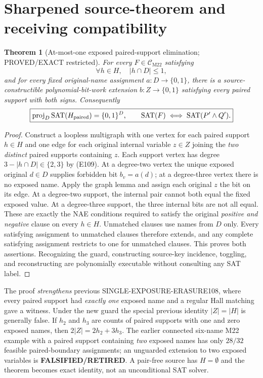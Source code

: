 \documentclass[11pt]{article}
\newtheorem{theorem}{Theorem}
\newcommand{\CM}{\mathcal C_{\mathrm{M22}}}
\newcommand{\SAT}{\operatorname{SAT}}
\begin{document}
\section{Sharpened source-theorem and receiving compatibility}
\begin{theorem}[At-most-one exposed paired-support elimination; PROVED/EXACT restricted]
For \emph{every} $F\in\CM$ satisfying
\[
\boxed{\qquad\forall h\in H,\quad |h\cap D|\le1,\qquad} \tag{E109}
\]
and for \emph{every} fixed original-name assignment $a:D\to\{0,1\}$, there is a source-constructible polynomial-bit-work extension $b:Z\to\{0,1\}$ satisfying every paired support with both signs. Consequently
\[
\boxed{\operatorname{proj}_{D}\SAT(H_{\rm paired})=\{0,1\}^{D},
\qquad\SAT(F)\iff\SAT(P'\wedge Q').}
\]
\end{theorem}
\begin{proof}
Construct a loopless multigraph with one vertex for each paired support $h\in H$ and one edge for each original internal variable $z\in Z$ joining the \emph{two distinct} paired supports containing $z$. Each support vertex has degree $3-|h\cap D|\in\{2,3\}$ by (E109). At a degree-two vertex the unique exposed original $d\in D$ supplies forbidden bit $b_v=a(d)$; at a degree-three vertex there is no exposed name. Apply the graph lemma and assign each original $z$ the bit on its edge. At a degree-two support, the internal pair cannot both equal the fixed exposed value. At a degree-three support, the three internal bits are not all equal. These are exactly the NAE conditions required to satisfy the original \emph{positive and negative} clause on every $h\in H$. Unmatched clauses use names from $D$ only. Every satisfying assignment to unmatched clauses therefore extends, and any complete satisfying assignment restricts to one for unmatched clauses. This proves both assertions. Recognizing the guard, constructing source-key incidence, toggling, and reconstructing are polynomially executable without consulting any SAT label.
\end{proof}

The proof \emph{strengthens} previous SINGLE-EXPOSURE-ERASURE108, where every paired support had \emph{exactly one} exposed name and a regular Hall matching gave a witness. Under the new guard the special previous identity $|Z|=|H|$ is generally false. If $h_2$ and $h_3$ are counts of paired supports with one and zero exposed names, then $2|Z|=2h_2+3h_3$. The earlier connected six-name M22 example with a paired support containing \emph{two} exposed names has only $28/32$ feasible paired-boundary assignments; an unguarded extension to two exposed variables is \textbf{FALSIFIED/RETIRED}. A pair-free source has $H=\emptyset$ and the theorem becomes exact identity, not an unconditional SAT solver.
\end{document}
